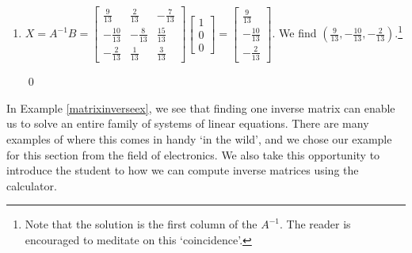 \documentclass{ximera}
\begin{document}
\begin{ex}
\begin{enumerate}
\begin{enumerate}
\item $X = A^{-1}B = \left[ \begin{array}{rrr} \frac{9}{13} & \frac{2}{13} & -\frac{7}{13} \\[3pt] -\frac{10}{13} & -\frac{8}{13} & \frac{15}{13} \\[3pt] -\frac{2}{13} & \frac{1}{13} & \frac{3}{13}  \end{array} \right] \left[ \begin{array}{r} 1 \\[3pt] 0 \\[3pt] 0 \end{array}\right] =  \left[ \begin{array}{r} \frac{9}{13} \\[3pt] -\frac{10}{13} \\[3pt] -\frac{2}{13} \end{array}\right]$. We find $\left( \frac{9}{13},  -\frac{10}{13},    -\frac{2}{13}   \right)$.\footnote{Note that the solution is the first column of the $A^{-1}$.  The reader is encouraged to meditate on this `coincidence'.}

\qed

\end{enumerate}

\end{enumerate}

\end{ex}

In Example \ref{matrixinverseex}, we see that finding one inverse matrix can enable us to solve an entire family of systems of linear equations.  There are many examples of where this comes in handy `in the wild', and we chose our example for this section from the field of electronics.  We also take this opportunity to introduce the student to how we can compute inverse matrices using the calculator.
\end{document}
